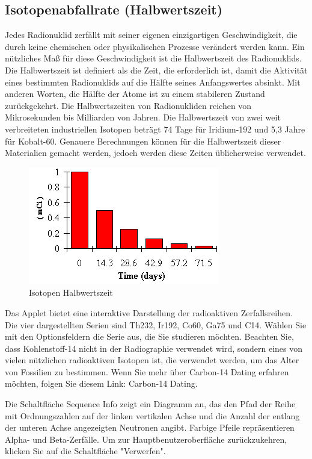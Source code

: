 \subsection{Isotopenabfallrate (Halbwertszeit)}
Jedes Radionuklid zerfällt mit seiner eigenen einzigartigen Geschwindigkeit, die durch keine chemischen oder physikalischen Prozesse verändert werden kann. Ein nützliches Maß für diese Geschwindigkeit ist die Halbwertszeit des Radionuklids. Die Halbwertszeit ist definiert als die Zeit, die erforderlich ist, damit die Aktivität eines bestimmten Radionuklids auf die Hälfte seines Anfangswertes absinkt. Mit anderen Worten, die Hälfte der Atome ist zu einem stabileren Zustand zurückgekehrt. Die Halbwertszeiten von Radionukliden reichen von Mikrosekunden bis Milliarden von Jahren. Die Halbwertszeit von zwei weit verbreiteten industriellen Isotopen beträgt 74 Tage für Iridium-192 und 5,3 Jahre für Kobalt-60. Genauere Berechnungen können für die Halbwertszeit dieser Materialien gemacht werden, jedoch werden diese Zeiten üblicherweise verwendet.
\begin{figure}[htb]
  \centering  
  \includegraphics[scale=0.5]{img/halbwertszeit.png}
  \caption{Isotopen Halbwertszeit}
  \label{fig:halbwertszeit}
\end{figure}

Das Applet bietet eine interaktive Darstellung der radioaktiven Zerfallsreihen. Die vier dargestellten Serien sind Th232, Ir192, Co60, Ga75 und C14. Wählen Sie mit den Optionsfeldern die Serie aus, die Sie studieren möchten. Beachten Sie, dass Kohlenstoff-14 nicht in der Radiographie verwendet wird, sondern eines von vielen nützlichen radioaktiven Isotopen ist, die verwendet werden, um das Alter von Fossilien zu bestimmen. Wenn Sie mehr über Carbon-14 Dating erfahren möchten, folgen Sie diesem Link: Carbon-14 Dating.

Die Schaltfläche Sequence Info zeigt ein Diagramm an, das den Pfad der Reihe mit Ordnungszahlen auf der linken vertikalen Achse und die Anzahl der entlang der unteren Achse angezeigten Neutronen angibt. Farbige Pfeile repräsentieren Alpha- und Beta-Zerfälle. Um zur Hauptbenutzeroberfläche zurückzukehren, klicken Sie auf die Schaltfläche "Verwerfen".

